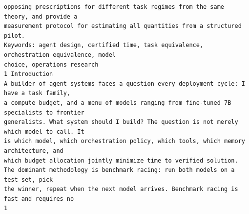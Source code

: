 \documentclass[11pt]{article}
\begin{document}
\begin{verbatim}
opposing prescriptions for different task regimes from the same theory, and provide a
measurement protocol for estimating all quantities from a structured pilot.
Keywords: agent design, certified time, task equivalence, orchestration equivalence, model
choice, operations research
1 Introduction
A builder of agent systems faces a question every deployment cycle: I have a task family,
a compute budget, and a menu of models ranging from fine-tuned 7B specialists to frontier
generalists. What system should I build? The question is not merely which model to call. It
is which model, which orchestration policy, which tools, which memory architecture, and
which budget allocation jointly minimize time to verified solution.
The dominant methodology is benchmark racing: run both models on a test set, pick
the winner, repeat when the next model arrives. Benchmark racing is fast and requires no
1
\end{verbatim}

\clearpage
\end{document}
